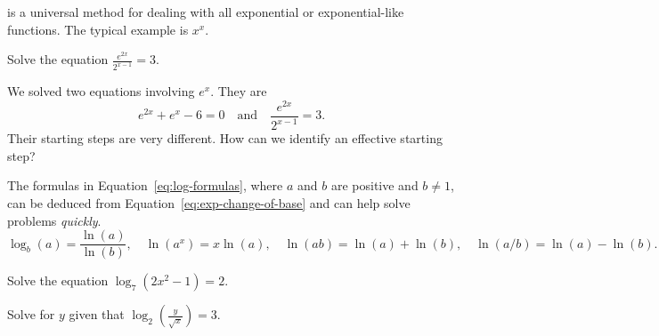 \documentclass[../main.tex]{subfiles}
\begin{document}
 is a universal method for dealing with all exponential or exponential-like functions. The typical example is \(x^{x}\).


\clearpage

%

\begin{example}
  Solve the equation \(\frac{e^{2x}}{2^{x-1}} = 3\).

\end{example}

We solved two equations involving \(e^{x}\). They are
\[
  e^{2x} + e^{x} - 6 = 0
  \quad\text{and}\quad
  \frac{e^{2x}}{2^{x-1}} = 3.
\]
Their starting steps are very different. How can we identify an effective starting step?
\blanks*

\clearpage

The formulas in Equation~\eqref{eq:log-formulas}, where \(a\) and \(b\) are positive and \(b \ne 1\), can be deduced from Equation~\eqref{eq:exp-change-of-base} and can help solve problems \emph{quickly}.
\begin{equation} \label{eq:log-formulas}
  \log_{b}(a) = \frac{\ln(a)}{\ln(b)},
  \quad
  \ln(a^{x}) = x \ln(a),
  \quad
  \ln(ab) = \ln(a) + \ln(b),
  \quad
  \ln(a/b) = \ln(a) - \ln(b).
\end{equation}

\begin{exercise}
  Solve the equation \(\log_{7}(2x^{2} - 1) = 2\).

  \blanks*
\end{exercise}

\begin{exercise}
  Solve for \(y\) given that \(\log_{2}\left(\frac{y}{\sqrt{x}}\right) = 3\).

\end{exercise}
\clearpage
\end{document}
